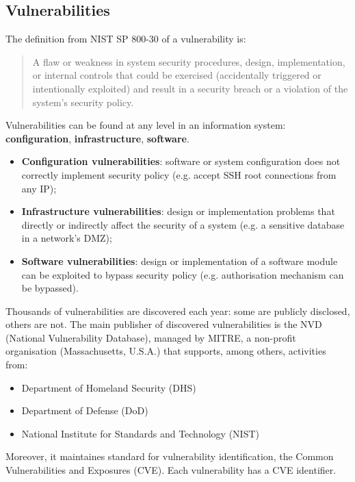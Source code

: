 \documentclass[a4paper, 10pt, titlepage]{article}
\begin{document}
\subsection*{Vulnerabilities}
The definition from NIST SP 800-30 of a vulnerability is:
\begin{quote}
	A flaw or weakness in system security
	procedures, design, implementation, or
	internal controls that could be exercised
	(accidentally triggered or intentionally
	exploited) and result in a security breach or a
	violation of the system's security policy.
\end{quote}
Vulnerabilities can be found at any level in an information system: \textbf{configuration}, \textbf{infrastructure}, \textbf{software}.
\begin{itemize}
\item \textbf{Configuration vulnerabilities}: software or system configuration does not correctly implement security policy (e.g. accept SSH root connections from any IP);
\item \textbf{Infrastructure vulnerabilities}: design or implementation problems that directly or indirectly affect the security of a system (e.g. a sensitive database in a network’s DMZ);
\item \textbf{Software vulnerabilities}: design or implementation of a software module can be exploited to bypass security policy (e.g. authorisation mechanism can be bypassed).
\end{itemize}
Thousands of vulnerabilities are discovered each year: some are publicly disclosed, others are not. 
The main publisher of discovered vulnerabilities is the NVD (National Vulnerability Database), managed by MITRE, a non-profit organisation (Massachusetts, U.S.A.) that supports, among others, activities from:
\begin{itemize}
	\item Department of Homeland Security (DHS)
	\item Department of Defense (DoD)
	\item National Institute for Standards and Technology (NIST)
\end{itemize}
Moreover, it maintaines standard for vulnerability identification, the Common Vulnerabilities and Exposures (CVE). Each vulnerability has a CVE identifier. 
\end{document}
